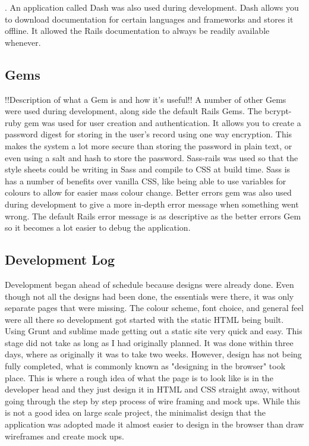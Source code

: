 \pageref{sec:deployment}. An application called Dash \citep{dash:2014} was also used during development. Dash allows you to download documentation for certain languages and frameworks and stores it offline. It allowed the Rails documentation to always be readily available whenever.

\subsection{Gems}
!!Description of what a Gem is and how it's useful!! A number of other Gems were used during development, along side the default Rails Gems. The bcrypt-ruby gem was used for user creation and authentication. It allows you to create a password digest for storing in the user's record using one way encryption. This makes the system a lot more secure than storing the password in plain text, or even using a salt and hash to store the password. Sass-rails was used so that the style sheets could be writing in Sass and compile to CSS at build time. Sass is has a number of benefits over vanilla CSS, like being able to use variables for colours to allow for easier mass colour change. Better errors gem was also used during development to give a more in-depth error message when something went wrong. The default Rails error message is as descriptive as the better errors Gem so it becomes a lot easier to debug the application.

\subsection{Development Log}
Development began ahead of schedule because designs were already done. Even though not all the designs had been done, the essentials were there, it was only separate pages that were missing. The colour scheme, font choice, and general feel were all there so development got started with the static HTML being built. Using Grunt \citep{grunt:2013} and sublime made getting out a static site very quick and easy. This stage did not take as long as I had originally planned. It was done within three days, where as originally it was to take two weeks. However, design has not being fully completed, what is commonly known as "designing in the browser" took place. This is where a rough idea of what the page is to look like is in the developer head and they just design it in HTML and CSS straight away, without going through the step by step process of wire framing and mock ups. While this is not a good idea on large scale project, the minimalist design that the application was adopted made it almost easier to design in the browser than draw wireframes and create mock ups.\\

